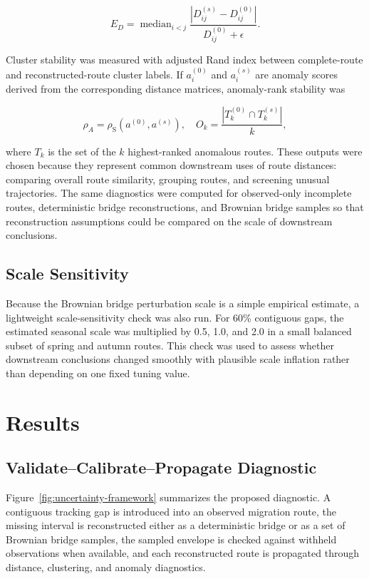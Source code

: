 \documentclass[pdflatex,sn-vancouver-num]{sn-jnl}
\begin{document}
\[
E_D =
\operatorname{median}_{i<j}
\frac{|D^{(s)}_{ij}-D^{(0)}_{ij}|}{D^{(0)}_{ij}+\epsilon}.
\]

Cluster stability was measured with adjusted Rand index between complete-route and reconstructed-route cluster labels. If $a_i^{(0)}$ and $a_i^{(s)}$ are anomaly scores derived from the corresponding distance matrices, anomaly-rank stability was

\[
\rho_A = \rho_{\mathrm{S}}(a^{(0)},a^{(s)}),
\quad
O_k = \frac{|T_k^{(0)}\cap T_k^{(s)}|}{k},
\]

where $T_k$ is the set of the $k$ highest-ranked anomalous routes. These outputs were chosen because they represent common downstream uses of route distances: comparing overall route similarity, grouping routes, and screening unusual trajectories. The same diagnostics were computed for observed-only incomplete routes, deterministic bridge reconstructions, and Brownian bridge samples so that reconstruction assumptions could be compared on the scale of downstream conclusions.

\subsection{Scale Sensitivity}\label{scale-sensitivity-methods}

Because the Brownian bridge perturbation scale is a simple empirical estimate, a lightweight scale-sensitivity check was also run. For 60\% contiguous gaps, the estimated seasonal scale was multiplied by 0.5, 1.0, and 2.0 in a small balanced subset of spring and autumn routes. This check was used to assess whether downstream conclusions changed smoothly with plausible scale inflation rather than depending on one fixed tuning value.

\section{Results}\label{results}

\subsection{Validate--Calibrate--Propagate Diagnostic}\label{validate-calibrate-propagate-diagnostic}

Figure~\ref{fig:uncertainty-framework} summarizes the proposed diagnostic. A contiguous tracking gap is introduced into an observed migration route, the missing interval is reconstructed either as a deterministic bridge or as a set of Brownian bridge samples, the sampled envelope is checked against withheld observations when available, and each reconstructed route is propagated through distance, clustering, and anomaly diagnostics.
\end{document}
